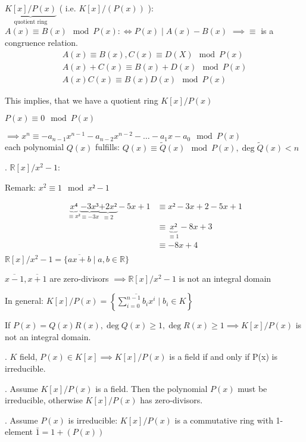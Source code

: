 $\underbrace{K[x]/ P(x)}_{\text{quotient ring}}$ ( i.e. $K[x] / (P(x))$ ): $A(x) \equiv B(x) \mod P(x) :\Leftrightarrow P(x) ∣ A(x) - B(x)$ $\implies \equiv $ is a congruence relation.
\begin{align*}
  A(x) \equiv B(x), C(x) \equiv D(X) \mod P(x) \\
  A(x) + C(x) \equiv B(x) + D(x) \mod P(x) \\
  A(x)C(x) \equiv B(x) D(x) \mod P(x)
\end{align*}

This implies, that we have a quotient ring $K[x]/ P(x)$

$P(x) \equiv 0 \mod P(x)$

$\implies x^n \equiv -a_{n-1}x^{n-1} - a_{n-2}x^{n-2} - \ldots - a_1 x - a_0 \mod P(x)$\\
each polynomial $Q(x)$ fulfills:
$Q(x) \equiv \tilde{Q}(x) \mod P(x), \deg \tilde{Q}(x)<n$

\Example.
$\mathbb{R}[x] / x^2-1$:
\begin{leftbar}
  Remark: $x^2 \equiv 1 \mod {x² -1}$
\end{leftbar}\vspace{-1cm}
\begin{align*}
  \underbrace{x⁴}_{\equiv x²}
  \underbrace{-3x³}_{\equiv -3x}
  \underbrace{+2x²}_{\equiv 2}
  -5x + 1                       & \equiv x² - 3x +2 - 5x + 1\\
                                & \equiv \underbrace{x²}_{\equiv 1} - 8x + 3\\
                                & \equiv -8x + 4\\
\end{align*}
$\mathbb{R}[x] / x^2 -1 = \{ \overline{ax+b} \mid a,b \in \mathbb{R} \}$

$\overline{x-1}, \overline{x+1}$ are zero-divisors $\implies \mathbb{R}[x] / x^2 -1$ is not an integral domain

In general: $K[x] / P(x) = \left\{ \overline{\sum_{i=0}^{n-1} b_i x^i} \mid b_i \in K\right\}$

If $P(x) = Q(x)R(x), \deg Q(x) \geq 1, \deg R(x) \geq 1 \implies K[x] / P(x)$ is not an integral domain.

\Theorem.
$K$ field, $P(x) \in K[x] \implies K[x] / P(x)$ is a field if and only if P(x) is irreducible.

\ProofForward.
Assume $K[x] / P(x)$ is a field. Then the polynomial $P(x)$ must be irreducible, otherwise $K[x] / P(x)$ has zero-divisors.

\ProofBackward. Assume $P(x)$ is irreducible:
$K[x] / P(x)$ is a commutative ring with 1-element $\bar{1} = 1+ (P(x))$

